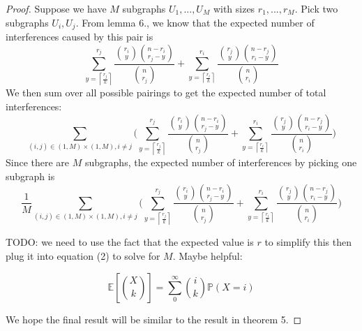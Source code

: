 \documentclass[10pt]{extarticle}
\newcommand{\E}{\mathbb{E}}
\theoremstyle{definition}
\begin{document}
\begin{proof}
    Suppose we have $M$ subgraphs $U_1,...,U_M$ with sizes $r_1,...,r_M$. Pick two subgraphs $U_i,U_j$. From lemma 6., we know that the expected number of interferences caused by this pair is
    $$
    \sum_{y = \left\lceil \frac{r_j}{k} \right\rceil}^{r_j}  \frac{\binom{r_i}{y} \binom{n-r_i}{r_j-y}}{\binom{n}{r_j}} + \sum_{y = \left\lceil \frac{r_i}{k} \right\rceil}^{r_i}  \frac{\binom{r_j}{y} \binom{n-r_j}{r_i-y}}{\binom{n}{r_i}}
    $$
    We then sum over all possible pairings to get the expected number of total interferences:
    $$
    \sum_{(i,j) \in (1,M)\times(1,M), i \ne j} \Biggl( \sum_{y = \left\lceil \frac{r_j}{k} \right\rceil}^{r_j}  \frac{\binom{r_i}{y} \binom{n-r_i}{r_j-y}}{\binom{n}{r_j}} + \sum_{y = \left\lceil \frac{r_i}{k} \right\rceil}^{r_i}  \frac{\binom{r_j}{y} \binom{n-r_j}{r_i-y}}{\binom{n}{r_i}} \Biggr)
    $$
    Since there are $M$ subgraphs, the expected number of interferences by picking one subgraph is
    $$
    \frac{1}{M} \sum_{(i,j) \in (1,M)\times(1,M), i \ne j} \Biggl( \sum_{y = \left\lceil \frac{r_j}{k} \right\rceil}^{r_j}  \frac{\binom{r_i}{y} \binom{n-r_i}{r_j-y}}{\binom{n}{r_j}} + \sum_{y = \left\lceil \frac{r_i}{k} \right\rceil}^{r_i}  \frac{\binom{r_j}{y} \binom{n-r_j}{r_i-y}}{\binom{n}{r_i}} \Biggr)
    $$


    
    TODO: we need to use the fact that the expected value is $r$ to simplify this then plug it into equation (2) to solve for $M$. Maybe helpful:

    $$
    \E \left[ \binom{X}{k} \right] = \sum_{0}^{\infty} \binom{i}{k} \mathbb{P}(X=i)
    $$
    
    
    We hope the final result will be similar to the result in theorem 5. 

    
\end{proof}
\end{document}
